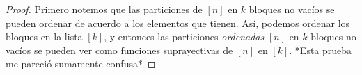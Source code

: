 \documentclass[spanish]{book}
\theoremstyle{definition}
\DeclareRobustCommand{\stirling}{\genfrac\{\}{0pt}{}}
\begin{document}
\begin{proof}
	Primero notemos que las particiones de $[n]$ en $k$ bloques no vacíos se pueden ordenar de acuerdo a los elementos que tienen. Así, podemos ordenar los bloques en la lista $[k]$, y entonces las particiones \textit{ordenadas} $[n]$ en $k$ bloques no vacíos se pueden	ver como funciones suprayectivas de $[n]$ en $[k]$. *Esta prueba me pareció sumamente confusa*
	
%	
%	

	
	
%	
%	
%	
%	

\end{proof}
\end{document}
